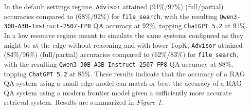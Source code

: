 \documentclass[11pt]{article}
\begin{document}
In the default settings regime, \texttt{Advisor} attained (91\%/97\%) (full/partial) 
accuracies compared to (68\%/92\%) for \texttt{file\_search}, with the resulting
\texttt{Qwen3-30B-A3B-Instruct-2507-FP8} QA accuracy at 92\%, topping \texttt{ChatGPT 
5.2} at 91\%. 
In a low resource regime meant to simulate the same systems configured as they might be
at the edge without reasoning and with lower TopK, \texttt{Advisor} attained (84\%/96\%) 
(full/partial) 
accuracies compared to (62\%/83\%) for \texttt{file\_search}, with the resulting
\texttt{Qwen3-30B-A3B-Instruct-2507-FP8} QA accuracy at 88\%, topping \texttt{ChatGPT 
5.2} at 85\%. 
These results indicate that the 
accuracy of a RAG QA system using a small edge model can match or beat the accuracy 
of a RAG QA system using a modern frontier model given a sufficiently 
more accurate retrieval system. Results are summarized in \textit{Figure 1}.
\end{document}
